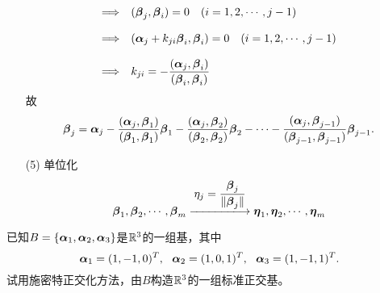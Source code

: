 \begin{frame}[allowframebreaks]
\begin{itemize}
$$\begin{array}{rl}
      \Longrightarrow &(\boldsymbol{\beta}_j,\boldsymbol{\beta}_i)=0 \quad (i=1,2,\cdots,j-1)\\[0.4cm] 
      \Longrightarrow &(\boldsymbol{\alpha}_j+k_{ji}\boldsymbol{\beta}_i,\boldsymbol{\beta}_i)=0 \quad (i=1,2,\cdots,j-1)\\[0.4cm] 
      \Longrightarrow& \displaystyle k_{ji}=-\frac{(\boldsymbol{\alpha}_j,\boldsymbol{\beta}_i)}{(\boldsymbol{\beta}_i,\boldsymbol{\beta}_i)} 
    \end{array}
    $$
    故
    $$
    \boldsymbol{\beta}_j=\boldsymbol{\alpha}_j-\frac{(\boldsymbol{\alpha}_j,\boldsymbol{\beta}_1)}{(\boldsymbol{\beta}_1,\boldsymbol{\beta}_1)}\boldsymbol{\beta}_1
    -\frac{(\boldsymbol{\alpha}_j,\boldsymbol{\beta}_2)}{(\boldsymbol{\beta}_2,\boldsymbol{\beta}_2)}\boldsymbol{\beta}_2
    -\cdots
    -\frac{(\boldsymbol{\alpha}_j,\boldsymbol{\beta}_{j-1})}{(\boldsymbol{\beta}_{j-1},\boldsymbol{\beta}_{j-1})}\boldsymbol{\beta}_{j-1}.
    $$
  \item[(5)] 单位化
    $$
    \betabd_1, \betabd_2, \cd, \betabd_m \xlongrightarrow[]{\ds \eta_j=\frac{\betabd_j}{\|\betabd_j\|}}
    \etabd_1, \etabd_2, \cd, \etabd_m
    $$
  \end{itemize}

\end{frame}


\begin{frame}[allowframebreaks]\ft{\secname}

\begin{li}
  已知$B=\{\boldsymbol{\alpha}_1,\boldsymbol{\alpha}_2,\boldsymbol{\alpha}_3\}$是$\mathbb R^3$的一组基，其中
  $$
  \boldsymbol{\alpha}_1=(1,-1,0)^T,~~
  \boldsymbol{\alpha}_2=(1,0,1)^T,~~
  \boldsymbol{\alpha}_3=(1,-1,1)^T.
  $$
  试用施密特正交化方法，由$B$构造$\mathbb R^3$的一组标准正交基。
\end{li}
\end{frame}


